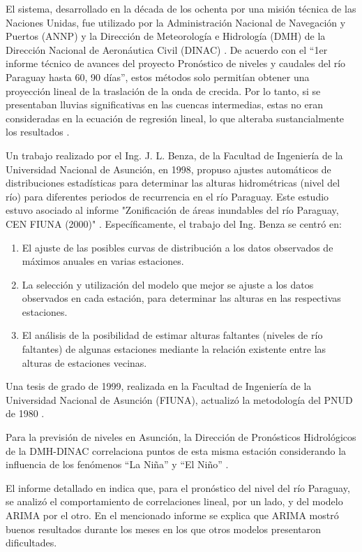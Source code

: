 El sistema, desarrollado en la década de los ochenta por una misión técnica de las Naciones Unidas, fue utilizado por la Administración Nacional de Navegación y Puertos (ANNP) y la Dirección de Meteorología e Hidrología (DMH) de la Dirección Nacional de Aeronáutica Civil (DINAC) \cite{CON20}. De acuerdo con el “1er informe técnico de avances del proyecto Pronóstico de niveles y caudales del río Paraguay hasta 60, 90 días”, estos métodos solo permitían obtener una proyección lineal de la traslación de la onda de crecida. Por lo tanto, si se presentaban lluvias significativas en las cuencas intermedias, estas no eran consideradas en la ecuación de regresión lineal, lo que alteraba sustancialmente los resultados \cite{CON20}.

Un trabajo realizado por el Ing. J. L. Benza, de la Facultad de Ingeniería de la Universidad Nacional de Asunción, en 1998, propuso ajustes automáticos de distribuciones estadísticas para determinar las alturas hidrométricas (nivel del río) para diferentes periodos de recurrencia en el río Paraguay. Este estudio estuvo asociado al informe "Zonificación de áreas inundables del río Paraguay, CEN FIUNA (2000)" \cite{CON20}. Específicamente, el trabajo del Ing. Benza se centró en:

\begin{enumerate}
\item El ajuste de las posibles curvas de distribución a los datos observados de máximos anuales en varias estaciones.
\item La selección y utilización del modelo que mejor se ajuste a los datos observados en cada estación, para determinar las alturas en las respectivas estaciones.
\item El análisis de la posibilidad de estimar alturas faltantes (niveles de río faltantes) de algunas estaciones mediante la relación existente entre las alturas de estaciones vecinas.
\end{enumerate}

Una tesis de grado de 1999, realizada en la Facultad de Ingeniería de la Universidad Nacional de Asunción (FIUNA), actualizó la metodología del PNUD de 1980 \cite{CON20}.

Para la previsión de niveles en Asunción, la Dirección de Pronósticos Hidrológicos de la DMH-DINAC correlaciona puntos de esta misma estación considerando la influencia de los fenómenos “La Niña” y “El Niño” \cite{CON20}.

El informe detallado en \cite{CON20} indica que, para el pronóstico del nivel del río Paraguay, se analizó el comportamiento de correlaciones lineal, por un lado, y del modelo ARIMA por el otro. En el mencionado informe se explica que ARIMA mostró buenos resultados durante los meses en los que otros modelos presentaron dificultades.

